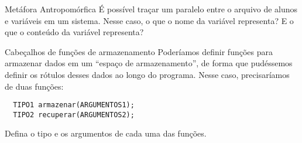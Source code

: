 \documentclass{beamer}
\begin{document}
\begin{frame}{Metáfora Antropomórfica}
\Large
\centering
  É possível traçar um paralelo entre o arquivo de alunos e variáveis em um
  sistema. Nesse caso, o que o nome da variável representa? E o que o conteúdo
  da variável representa?
\end{frame}



\begin{frame}[fragile]{Cabeçalhos de funções de armazenamento}
\large
  Poderíamos definir funções para armazenar dados em um ``espaço de
  armazenamento'', de forma que pudéssemos definir os rótulos desses dados ao
  longo do programa. Nesse caso, precisaríamos de duas funções:

  \begin{verbatim}
  TIPO1 armazenar(ARGUMENTOS1);
  TIPO2 recuperar(ARGUMENTOS2);
  \end{verbatim}

  Defina o tipo e os argumentos de cada uma das funções.
\end{frame}
\end{document}
